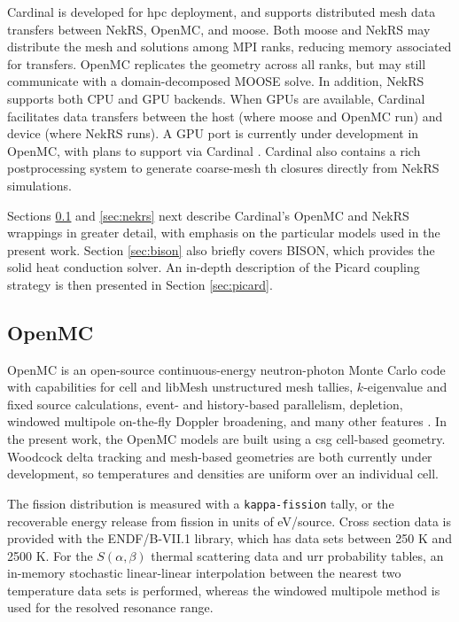\documentclass[3p,,preprint,11pt]{elsarticle}
\begin{document}
Cardinal is developed for \gls{hpc} deployment, and supports distributed mesh data transfers between NekRS, OpenMC, and \gls{moose}. Both \gls{moose} and NekRS may distribute the mesh and solutions among MPI ranks, reducing memory associated for transfers. OpenMC replicates the geometry across all ranks, but may still communicate with a domain-decomposed MOOSE solve.
In addition, NekRS supports both CPU and GPU backends. When GPUs are available, Cardinal facilitates data transfers between the host (where \gls{moose} and OpenMC run) and device (where NekRS runs). A GPU port is currently under development in OpenMC, with plans to support via Cardinal \cite{tramm}. Cardinal also contains a rich postprocessing system to generate coarse-mesh \gls{th} closures directly from NekRS simulations.%

Sections \ref{sec:openmc} and \ref{sec:nekrs} next describe Cardinal's OpenMC and NekRS wrappings in greater detail, with emphasis on the particular models used in the present work. Section \ref{sec:bison} also briefly covers BISON, which provides the solid heat conduction solver.
An in-depth description of the Picard coupling strategy is then presented in Section \ref{sec:picard}.

\subsection{OpenMC}
\label{sec:openmc}

OpenMC is an open-source continuous-energy neutron-photon Monte Carlo code with capabilities for cell and libMesh unstructured mesh tallies, $k$-eigenvalue and fixed source calculations, event- and history-based parallelism, depletion, windowed multipole on-the-fly Doppler broadening, and many other features \cite{openmc}.
In the present work, the OpenMC models are built using a \gls{csg} cell-based geometry.
Woodcock delta tracking and mesh-based geometries are both currently under development, so temperatures and densities are uniform over an individual cell.

The fission distribution is measured with a {\tt kappa-fission} tally, or the recoverable energy release from fission in units of eV/source. Cross section data is provided with the ENDF/B-VII.1 library, which has data sets between 250 \si{\kelvin} and 2500 \si{\kelvin}. For the $S(\alpha,\beta)$ thermal scattering data and \gls{urr} probability tables, an in-memory stochastic linear-linear interpolation between the nearest two temperature data sets is performed, whereas the windowed multipole method is used for the resolved resonance range. %
\end{document}
